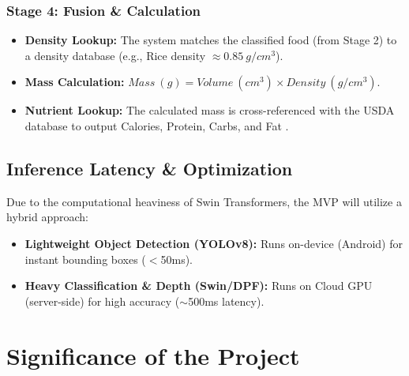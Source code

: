 \documentclass[fleqn,10pt]{SelfArx} %
\begin{document}
\subsubsection{Stage 4: Fusion \& Calculation}

\begin{itemize}[noitemsep]
    \item \textbf{Density Lookup:} The system matches the classified food (from Stage 2) to a density database (e.g., Rice density $\approx 0.85\ g/cm^3$).
    \item \textbf{Mass Calculation:} $Mass\ (g) = Volume\ (cm^3) \times Density\ (g/cm^3)$.
    \item \textbf{Nutrient Lookup:} The calculated mass is cross-referenced with the USDA database to output Calories, Protein, Carbs, and Fat \cite{usdafooddata2024}.
\end{itemize}

\subsection{Inference Latency \& Optimization}

Due to the computational heaviness of Swin Transformers, the MVP will utilize a hybrid approach:

\begin{itemize}[noitemsep]
    \item \textbf{Lightweight Object Detection (YOLOv8):} Runs on-device (Android) for instant bounding boxes ($<$50ms).
    \item \textbf{Heavy Classification \& Depth (Swin/DPF):} Runs on Cloud GPU (server-side) for high accuracy ($\sim$500ms latency).
\end{itemize}


\section{Significance of the Project}
\end{document}
